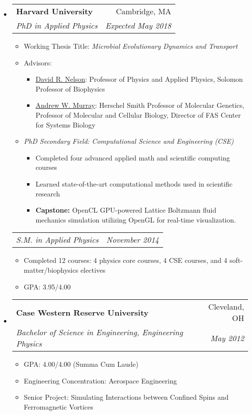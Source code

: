 \documentclass[letterpaper,11pt]{article}
\makeatletter
\newcommand{\resitem}[1]{\item #1 \vspace{-2pt}}
\newcommand{\ressubheading}[4]{\vspace{-14pt}
\begin{tabular*}{7.0in}{l@{\extracolsep{\fill}}r}
                \\
                \textbf{#1} & #2 \\
                \textit{#3} & \textit{#4} \\
\end{tabular*}\vspace{-6pt}}
\newcommand{\resbelowsubheading}[2]{\vspace{-14pt}
\begin{tabular*}{7.0in}{l@{\extracolsep{\fill}}r}
                \\
                \textit{#1} & \textit{#2} \\
\end{tabular*}\vspace{-6pt}}
\makeatother
\begin{document}
\begin{itemize}
\item
        \ressubheading{Harvard University}{Cambridge, MA}{PhD in Applied Physics}{Expected May 2018}     
        \begin{itemize}
                \resitem{Working Thesis Title: \textit{Microbial Evolutionary Dynamics and Transport}}
                \resitem{Advisors:}
                \begin{itemize}
                        \resitem{\href{http://www.seas.harvard.edu/directory/nelson}{David R. Nelson}: Professor of Physics and Applied Physics, Solomon Professor of Biophysics}
                \resitem{\href{https://www.mcb.harvard.edu/mcb/faculty/profile/andrew-w-murray/}{Andrew W. Murray}: Herschel Smith Professor of Molecular Genetics,
Professor of Molecular and Cellular Biology,
Director of FAS Center for Systems Biology}
                \end{itemize}           
                \resitem{\emph{PhD Secondary Field: Computational Science and Engineering (CSE)}}         
                \begin{itemize}
                        \resitem{Completed four advanced applied math and scientific computing courses}
                        \resitem{Learned state-of-the-art computational methods used in scientific research}
                        \resitem{\textbf{Capstone:} OpenCL GPU-powered Lattice Boltzmann fluid mechanics simulation utilizing OpenGL for real-time visualization.  }
                \end{itemize}                   
        \end{itemize}

\resbelowsubheading{S.M. in Applied Physics}{November 2014}
        \begin{itemize}
        \resitem{Completed 12 courses: 4 physics core courses, 4 CSE courses, and 4 soft-matter/biophysics electives}
        \resitem{GPA: 3.95/4.00}
        \end{itemize}
\item
        \ressubheading{Case Western Reserve University}{Cleveland, OH}{Bachelor of Science in Engineering, Engineering Physics}{May 2012}
        \begin{itemize}
                \resitem{GPA: 4.00/4.00 (Summa Cum Laude)}
                \resitem{Engineering Concentration: Aerospace Engineering}
                \resitem{Senior Project: Simulating Interactions between Confined Spins and Ferromagnetic Vortices}
        \end{itemize}
\end{itemize}
\end{document}
